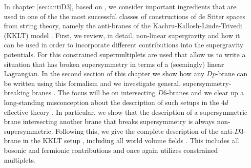 \documentclass[a4paper,12pt,twoside,openright]{report}
\begin{document}
In chapter \ref{sec:antiD3}, based on \cite{Cribiori:2019hod,Cribiori:2020bgt}, we consider important ingredients that are used in one of the the most successful classes of constructions of de Sitter spaces from string theory, namely the anti-branes of the Kachru-Kallosh-Linde-Trivedi (KKLT) model \cite{Kachru:2003aw}. First, we review, in detail, non-linear supergravity and how it can be used in order to incorporate different contributions into the supergravity potentials. For this constrained supermultiplets \cite{Rocek:1978nb,Lindstrom:1979kq,Samuel:1982uh,Komargodski:2009rz,DallAgata:2016syy,Ferrara:2016een} are used that allow us to write a situation that has broken supersymmetry in terms of a (seemingly) linear Lagrangian. In the second section of this chapter we show how any $Dp$-brane can be written using this formalism \cite{Cribiori:2020bgt} and we investigate general, supersymmetry-breaking branes \cite{Sugimoto:1999tx,Antoniadis:1999xk,Angelantonj:1999jh,Aldazabal:1999jr,Angelantonj:1999ms,Dudas:2000nv,Pradisi:2001yv}. The focus will be on intersecting $D6$-branes and we clear up a long-standing misconception about the description of such setups in the $4d$ effective theory \cite{Villadoro:2006ia,Blumenhagen:2002wn,Kachru:1999vj,Cvetic:2001nr}. In particular, we show that the description of a supersymmetric brane intersecting another brane that breaks supersymmetry is always non-supersymmetric. Following this, we give the complete description of the anti-$D3$-brane in the KKLT setup \cite{Cribiori:2019hod}, including all world volume fields \cite{GarciadelMoral:2017vnz}. This includes all bosonic and fermionic contributions and once again utilizes constrained multiplets.\\
\end{document}

